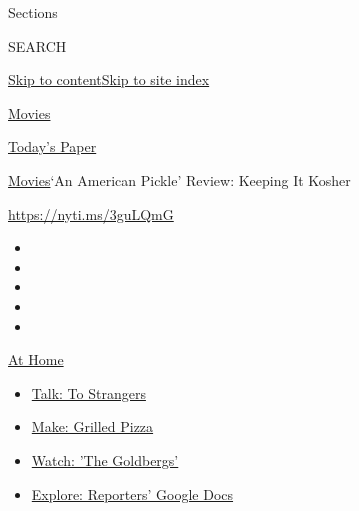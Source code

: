 Sections

SEARCH

\protect\hyperlink{site-content}{Skip to
content}\protect\hyperlink{site-index}{Skip to site index}

\href{https://www.nytimes3xbfgragh.onion/section/movies}{Movies}

\href{https://myaccount.nytimes3xbfgragh.onion/auth/login?response_type=cookie\&client_id=vi}{}

\href{https://www.nytimes3xbfgragh.onion/section/todayspaper}{Today's
Paper}

\href{/section/movies}{Movies}\textbar{}`An American Pickle' Review:
Keeping It Kosher

\url{https://nyti.ms/3guLQmG}

\begin{itemize}
\item
\item
\item
\item
\item
\end{itemize}

\href{https://www.nytimes3xbfgragh.onion/spotlight/at-home?action=click\&pgtype=Article\&state=default\&region=TOP_BANNER\&context=at_home_menu}{At
Home}

\begin{itemize}
\tightlist
\item
  \href{https://www.nytimes3xbfgragh.onion/2020/08/03/well/family/the-benefits-of-talking-to-strangers.html?action=click\&pgtype=Article\&state=default\&region=TOP_BANNER\&context=at_home_menu}{Talk:
  To Strangers}
\item
  \href{https://www.nytimes3xbfgragh.onion/2020/08/01/at-home/coronavirus-make-pizza-on-a-grill.html?action=click\&pgtype=Article\&state=default\&region=TOP_BANNER\&context=at_home_menu}{Make:
  Grilled Pizza}
\item
  \href{https://www.nytimes3xbfgragh.onion/2020/07/31/arts/television/goldbergs-abc-stream.html?action=click\&pgtype=Article\&state=default\&region=TOP_BANNER\&context=at_home_menu}{Watch:
  'The Goldbergs'}
\item
  \href{https://www.nytimes3xbfgragh.onion/interactive/2020/at-home/even-more-reporters-editors-diaries-lists-recommendations.html?action=click\&pgtype=Article\&state=default\&region=TOP_BANNER\&context=at_home_menu}{Explore:
  Reporters' Google Docs}
\end{itemize}

